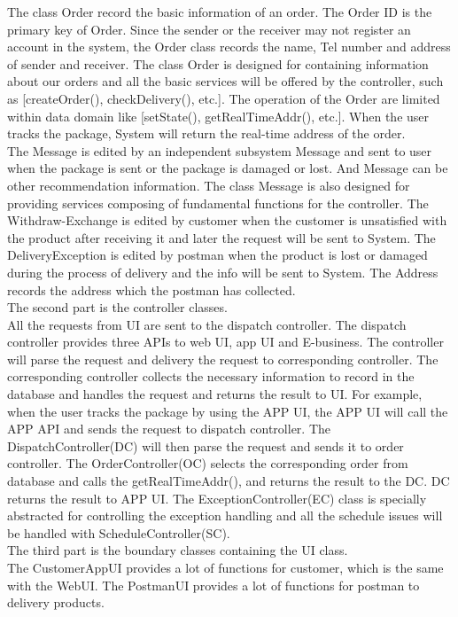 \documentclass[12pt]{scrreprt}
\begin{document}
The class Order record the basic information of an order. The Order ID is the primary key of Order.
Since the sender or the receiver may not register an account in the system, the Order class records the name, Tel number and address of sender and receiver. The class Order is designed for containing information about our orders and all the basic services will be offered by the controller, such as [createOrder(), checkDelivery(), etc.]. The operation of the Order are limited within data domain like [setState(), getRealTimeAddr(), etc.]. When the user tracks the package, System will return the real-time address of the order.\\
The Message is edited by an independent subsystem Message and sent to user when the package is sent or the package is damaged or lost. And Message can be other recommendation information. The class Message is also designed for providing services composing of fundamental functions for the controller.
The Withdraw-Exchange is edited by customer when the customer is unsatisfied with the product after receiving it and later the request will be sent to System.
The DeliveryException is edited by postman when the product is lost or damaged during the process of delivery and the info will be sent to System.
The Address records the address which the postman has collected.\\
The second part is the controller classes.\\
All the requests from UI are sent to the dispatch controller. The dispatch controller provides three APIs to web UI, app UI and E-business. The controller will parse the request and delivery the request to corresponding controller. The corresponding controller collects the necessary information to record in the database and handles the request and returns the result to UI. For example, when the user tracks the package by using the APP UI, the APP UI will call the APP API and sends the request to dispatch controller. The DispatchController(DC) will then parse the request and sends it to order controller. The OrderController(OC) selects the corresponding order from database and calls the getRealTimeAddr(), and returns the result to the DC. DC returns the result to APP UI. The ExceptionController(EC) class is specially abstracted for controlling the exception handling and all the schedule issues will be handled with ScheduleController(SC).\\
The third part is the boundary classes containing the UI class.\\
The CustomerAppUI provides a lot of functions for customer, which is the same with the WebUI.
The PostmanUI provides a lot of functions for postman to delivery products.
\end{document}
